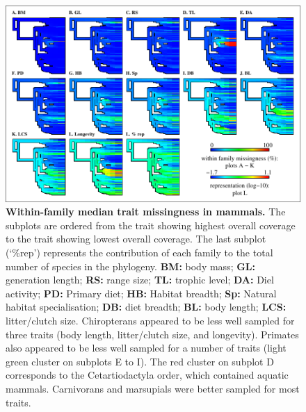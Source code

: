 \begin{figure}[]
\centering
\includegraphics[scale=1.1]{figures/chapter2/NA_phylo_patterns/Mammals_coverage}
\caption[Within-family median trait missingness in mammals]{\textbf{Within-family median trait missingness in mammals.} The subplots are ordered from the trait showing highest overall coverage to the trait showing lowest overall coverage. The last subplot (`\%rep') represents the contribution of each family to the total number of species in the phylogeny. \textbf{BM:} body mass; \textbf{GL:} generation length; \textbf{RS:} range size; \textbf{TL:} trophic level; \textbf{DA:} Diel activity; \textbf{PD:} Primary diet; \textbf{HB:} Habitat breadth; \textbf{Sp:} Natural habitat specialisation; \textbf{DB:} diet breadth; \textbf{BL:} body length; \textbf{LCS:} litter/clutch size. Chiropterans appeared to be less well sampled for three traits (body length, litter/clutch size, and longevity). Primates also appeared to be less well sampled for a number of traits (light green cluster on subplots E to I). The red cluster on subplot D corresponds to the Cetartiodactyla order, which contained aquatic mammals. Carnivorans and marsupials were better sampled for most traits. }
\label{familycov_mammals}
\end{figure}

